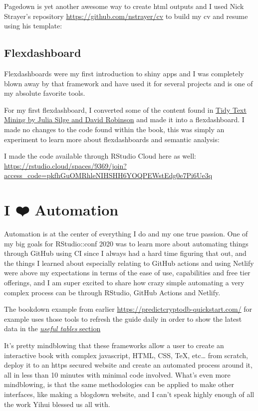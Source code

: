 \documentclass[
]{book}
\begin{document}
Pagedown\citep{R-pagedown} is yet another awesome way to create html outputs and I used Nick Strayer's repository \url{https://github.com/nstrayer/cv} to build my cv and resume using his template:

\hypertarget{flexdashboard}{%
\subsection{Flexdashboard}\label{flexdashboard}}

Flexdashboards\citep{R-flexdashboard} were my first introduction to shiny apps and I was completely blown away by that framework and have used it for several projects and is one of my absolute favorite tools.

For my first flexdashboard, I converted some of the content found in \href{https://www.tidytextmining.com/}{Tidy Text Mining by Julia Silge and David Robinson} and made it into a flexdashboard. I made no changes to the code found within the book, this was simply an experiment to learn more about flexdashboards and semantic analysis:

I made the code available through RStudio Cloud here as well: \url{https://rstudio.cloud/spaces/9369/join?access_code=pkfhGuOMRhleNIHSHH6YOQPEWstEdg0e7Pi6Ue3q}

\hypertarget{automation}{%
\section{I ❤️ Automation}\label{automation}}

Automation is at the center of everything I do and my one true passion. One of my big goals for RStudio::conf 2020 was to learn more about automating things through GitHub using CI since I always had a hard time figuring that out, and the things I learned about especially relating to GitHub actions and using Netlify were above my expectations in terms of the ease of use, capabilities and free tier offerings, and I am super excited to share how crazy simple automating a very complex process can be through RStudio, GitHub Actions and Netlify.

The bookdown example from earlier \url{https://predictcryptodb-quickstart.com/} for example uses those tools to refresh the guide daily in order to show the latest data in the \href{https://predictcryptodb-quickstart.com/useful-tables.html}{\emph{useful tables} section}

It's pretty mindblowing that these frameworks allow a user to create an interactive book with complex javascript, HTML, CSS, TeX, etc\ldots{} from scratch, deploy it to an https secured website and create an automated process around it, all in less than 10 minutes with minimal code involved. What's even more mindblowing, is that the same methodologies can be applied to make other interfaces, like making a blogdown website, and I can't speak highly enough of all the work Yihui blessed us all with.
\end{document}
